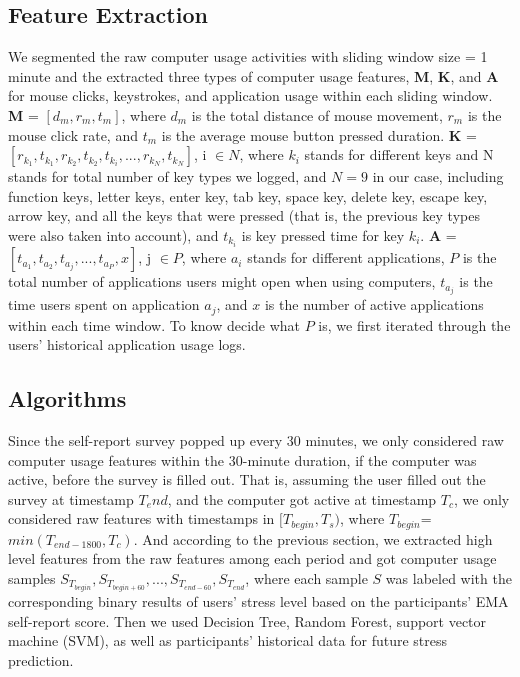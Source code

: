 \documentclass{article}
\begin{document}
\subsection{Feature Extraction}
We segmented the raw computer usage activities with sliding window size = 1 minute and the extracted three types of computer usage features, \textbf{M}, \textbf{K}, and \textbf{A} for mouse clicks, keystrokes, and application usage within each sliding window. \textbf{M} = $[d_{m}, r_{m}, t_{m}]$, where $d_{m}$ is the total distance of mouse movement, $r_{m}$ is the mouse click rate, and $t_{m}$ is the average mouse button pressed duration. \textbf{K} = $[r_{k_1}, t_{k_1}, r_{k_2}, t_{k_2}, t_{k_i}, ..., r_{k_N}, t_{k_N}]$, i $\in{N}$, where $k_{i}$ stands for different keys and N stands for total number of key types we logged, and $N=9$ in our case, including function keys, letter keys, enter key, tab key, space key, delete key, escape key, arrow key, and all the keys that were pressed (that is, the previous key types were also taken into account), and $t_{k_i}$ is key pressed time for key $k_{i}$.  \textbf{A} = $[t_{a_1}, t_{a_2}, t_{a_j}, ..., t_{a_P}, x]$, j $\in{P}$, where $a_{i}$ stands for different applications, $P$ is the total number of applications users might open when using computers, $t_{a_j}$ is the time users spent on application $a_{j}$, and $x$ is the number of active applications within each time window. To know decide what $P$ is, we first iterated through the users' historical application usage logs.

\subsection{Algorithms}
Since the self-report survey popped up every 30 minutes, we only considered raw computer usage features within the 30-minute duration, if the computer was active,  before the survey is filled out. That is, assuming the user filled out the survey at timestamp $T_end$, and the computer got active at timestamp $T_c$, we only considered raw features with timestamps in $[T_{begin}, T_s)$, where $T_{begin}$=$min(T_{end-1800}, T_c)$. And according to the previous section, we extracted high level features from the raw features among each period and got computer usage samples $S_{T_{begin}}, S_{T_{begin+60}}, ..., S_{T_{end-60}}, S_{T_{end}}$, where each sample $S$ was labeled with the corresponding binary results of users' stress level based on the participants' EMA self-report score. Then we used Decision Tree, Random Forest, support vector machine (SVM), as well as participants' historical data for future stress prediction.
\end{document}
